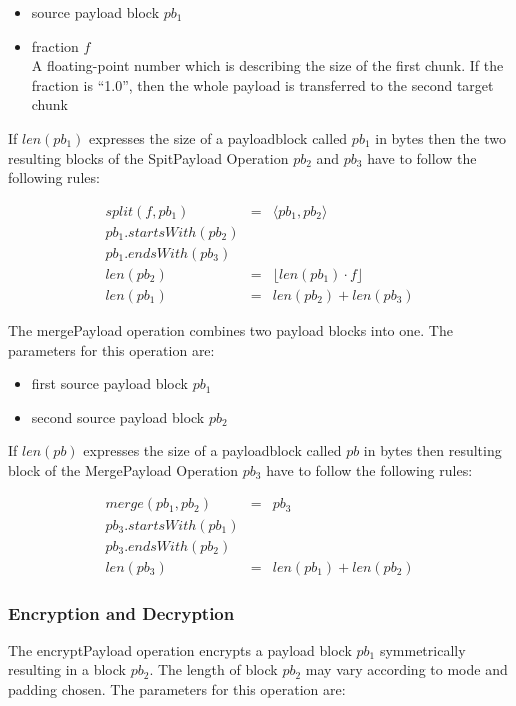 \documentclass[10pt,journal,compsoc]{IEEEtran}
\begin{document}
\begin{itemize}
	\item source payload block $pb_1$
	\item fraction $f$\\
	A floating-point number which is describing the size of the first chunk. If the fraction is ``1.0'', then the whole payload is transferred to the second target chunk
\end{itemize}

If $len(pb_1)$ expresses the size of a payloadblock called $pb_1$ in bytes then the two resulting blocks of the SpitPayload Operation $pb_2$ and $pb_3$ have to follow the following rules:

\begin{eqnarray}
split(f, pb_1) & = &\langle pb_1, pb_2 \rangle\\
pb_1.startsWith(pb_2)\\
pb_1.endsWith(pb_3)\\
len(pb_2) & = & \lfloor len(pb_1)\cdot f\rfloor\\
len(pb_1) & = & len(pb_2) + len(pb_3)
\end{eqnarray}

The mergePayload operation combines two payload blocks into one. The parameters for this operation are:

\begin{itemize}
	\item first source payload block $pb_1$
	\item second source payload block $pb_2$
\end{itemize}

If $len(pb)$ expresses the size of a payloadblock called $pb$ in bytes then resulting block of the MergePayload Operation $pb_3$ have to follow the following rules:

\begin{eqnarray}
merge(pb_1, pb_2) & = & pb_3 \\
pb_3.startsWith(pb_1)\\
pb_3.endsWith(pb_2)\\
len(pb_3) & = & len(pb_1) + len(pb_2)
\end{eqnarray}

\subsubsection{Encryption and Decryption}
The encryptPayload operation encrypts a payload block $pb_1$ symmetrically resulting in a block $pb_2$. The length of block $pb_2$ may vary according to mode and padding chosen. The parameters for this operation are:
\end{document}
